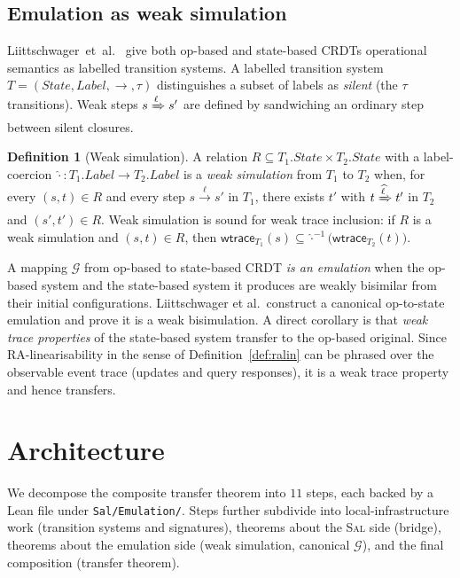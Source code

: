 \documentclass[11pt,a4paper]{article}
\theoremstyle{definition}
\newtheorem{definition}[theorem]{Definition}
\theoremstyle{remark}
\newcommand{\wtrace}{\mathsf{wtrace}}
\newcommand{\Sal}{\textsc{Sal}}
\newcommand{\Emul}{\mathcal{G}}
\begin{document}
\subsection{Emulation as weak simulation}

Liittschwager~et~al.~\cite{liittschwager2025} give both op-based and
state-based CRDTs operational semantics as labelled transition
systems. A labelled transition system $T = (\mathit{State},
\mathit{Label}, \to, \tau)$ distinguishes a subset of labels as
\emph{silent} (the $\tau$ transitions). Weak steps $s
\xRightarrow{\ell} s'$ are defined by sandwiching an ordinary step
between silent closures.

\begin{definition}[Weak simulation]
\label{def:weaksim}
A relation $R \subseteq T_1.\mathit{State} \times T_2.\mathit{State}$
with a label-coercion $\widehat{\cdot}\colon T_1.\mathit{Label} \to
T_2.\mathit{Label}$ is a \emph{weak simulation} from $T_1$ to $T_2$
when, for every $(s, t) \in R$ and every step $s
\xrightarrow{\ell} s'$ in $T_1$, there exists $t'$ with
$t \xRightarrow{\widehat{\ell}} t'$ in $T_2$ and $(s', t') \in R$.
Weak simulation is sound for weak trace inclusion: if
$R$ is a weak simulation and $(s, t) \in R$, then
$\wtrace_{T_1}(s) \subseteq \widehat{\cdot}^{-1}\bigl(\wtrace_{T_2}(t)\bigr)$.
\end{definition}

A mapping $\Emul$ from op-based to state-based CRDT \emph{is an
emulation} when the op-based system and the state-based system it
produces are weakly bisimilar from their initial configurations.
Liittschwager et al.\ construct a canonical op-to-state emulation
and prove it is a weak bisimulation. A direct corollary is that
\emph{weak trace properties} of the state-based system transfer to
the op-based original. Since RA-linearisability in the sense of
Definition~\ref{def:ralin} can be phrased over the observable event
trace (updates and query responses), it is a weak trace property
and hence transfers.

\section{Architecture}
\label{sec:architecture}

We decompose the composite transfer theorem into $11$ steps, each
backed by a Lean file under \texttt{Sal/Emulation/}. Steps further
subdivide into local-infrastructure work (transition systems and
signatures), theorems about the \Sal{} side (bridge), theorems
about the emulation side (weak simulation, canonical $\Emul$), and
the final composition (transfer theorem).
\end{document}
